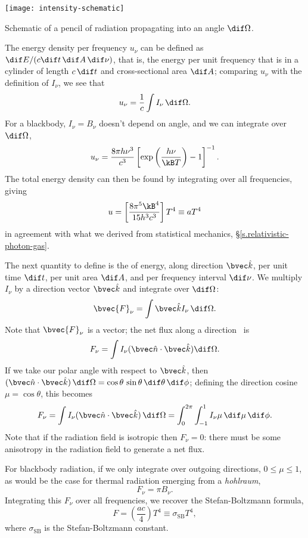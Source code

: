 \begin{marginfigure}
\texttt{[image: intensity-schematic]}
\caption{\label{f.intensity-schematic}Schematic of a pencil of radiation propagating into an angle $\dif\Omega$.}
\end{marginfigure}

The energy density per frequency $u_{\nu}$ can be defined as $\dif E/(c \dif t\,\dif A\,\dif\nu)$, that is, the energy per unit frequency that is in a cylinder of length $c\,\dif t$ and cross-sectional area $\dif A$; comparing $u_{\nu}$ with the definition of $I_{\nu}$, we see that
\[
u_{\nu} = \frac{1}{c}\int I_{\nu}\,\dif\Omega .
\]
For a blackbody, $I_{\nu}=B_{\nu}$ doesn't depend on angle, and we can integrate over $\dif\Omega$,
\begin{equation}\label{e.radiation-energy-density}
u_{\nu}= \frac{8\pi h\nu^{3}}{c^{3}}\left[\exp\left(\frac{h\nu}{\kB T}\right)-1\right]^{-1}.
\end{equation}
The total energy density can then be found by integrating over all frequencies, giving
\[ u = \left[\frac{8\pi^{5}\kB^{4}}{15 h^{3}c^{3}}\right] T^{4}\equiv aT^{4} \]
in agreement with what we derived from statistical mechanics, \S\ref{s.relativistic-photon-gas}.

The next quantity to define is the  of energy, along direction $\unitk$, per unit time $\dif t$,  per unit area $\dif A$, and per frequency interval $\dif\nu$. We multiply $I_{\nu}$ by a direction vector $\unitk$ and integrate over $\dif\Omega$:
\begin{equation}\label{e.radiation-flux}
\bvec{F}_{\nu} = \int \unitk I_{\nu} \,\dif\Omega.
\end{equation}
Note that $\bvec{F}_{\nu}$ is a vector;  the net flux along a direction \unitn\ is
\[ F_{\nu} = \int I_{\nu}(\unitn\cdot\unitk)\dif\Omega. \]
If we take our polar angle with respect to $\unitk$, then $(\unitn\cdot\unitk)\,\dif\Omega = \cos\theta\,\sin\theta\,\dif\theta\,\dif \phi$; defining the direction cosine $\mu = \cos\theta$, this becomes 
\[ F_{\nu} = \int I_{\nu} (\unitn\cdot\unitk)\,\dif\Omega = \int_{0}^{2\pi} \int_{-1}^{1} I_{\nu}\mu\,\dif\mu\,\dif\phi. \]
Note that if the radiation field is isotropic then $F_{\nu}=0$: there must be some anisotropy in the radiation field to generate a net flux.

For blackbody radiation, if we only integrate over outgoing directions, $0\le \mu\le 1$, as would be the case for thermal radiation emerging from a \emph{hohlraum},
\[ F_{\nu} = \pi B_{\nu}.\]
Integrating this $F_{\nu}$ over all frequencies, we recover the Stefan-Boltzmann formula,
\[ F = \left(\frac{ac}{4}\right) T^{4} \equiv \sigma_{\mathrm{SB}} T^{4}, \]
where $\sigma_{\mathrm{SB}}$ is the Stefan-Boltzmann constant.

